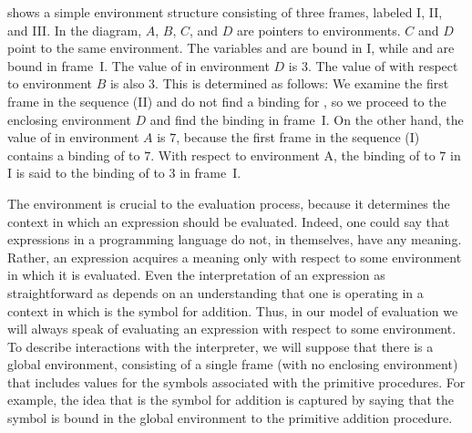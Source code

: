  shows a simple environment structure consisting of three frames, labeled I, II, and III.
In the diagram, \( A \), \( B \), \( C \), and \( D \) are pointers to environments.
\( C \) and \( D \) point to the same environment.
The variables  and  are bound in I, while  and  are bound in frame I.
The value of  in environment \( D \) is \( 3 \).
The value of  with respect to environment \( B \) is also \( 3 \).
This is determined as follows:
We examine the first frame in the sequence (II) and do not find a binding for , so we proceed to the enclosing environment \( D \) and find the binding in frame I.
On the other hand, the value of  in environment \( A \) is \( 7 \), because the first frame in the sequence (I) contains a binding of  to \( 7 \).
With respect to environment A, the binding of  to \( 7 \) in I is said to  the binding of  to \( 3 \) in frame I.

The environment is crucial to the evaluation process, because it determines the context in which an expression should be evaluated.
Indeed, one could say that expressions in a programming language do not, in themselves, have any meaning.
Rather, an expression acquires a meaning only with respect to some environment in which it is evaluated.
Even the interpretation of an expression as straightforward as  depends on an understanding that one is operating in a context in which \code{+} is the symbol for addition.
Thus, in our model of evaluation we will always speak of evaluating an expression with respect to some environment.
To describe interactions with the interpreter, we will suppose that there is a global environment, consisting of a single frame (with no enclosing environment) that includes values for the symbols associated with the primitive procedures.
For example, the idea that \code{+} is the symbol for addition is captured by saying that the symbol \code{+} is bound in the global environment to the primitive addition procedure.





